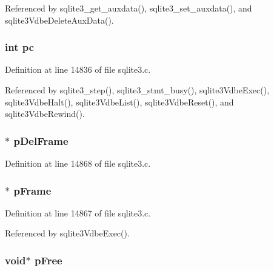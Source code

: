 Referenced by sqlite3\+\_\+get\+\_\+auxdata(), sqlite3\+\_\+set\+\_\+auxdata(), and sqlite3\+Vdbe\+Delete\+Aux\+Data().

\hypertarget{struct_vdbe_ac8c81e61335635fa4709d82412b31f06}{}
\subsubsection[{pc}]{\setlength{\rightskip}{0pt plus 5cm}int pc}\label{struct_vdbe_ac8c81e61335635fa4709d82412b31f06}


Definition at line 14836 of file sqlite3.\+c.



Referenced by sqlite3\+\_\+step(), sqlite3\+\_\+stmt\+\_\+busy(), sqlite3\+Vdbe\+Exec(), sqlite3\+Vdbe\+Halt(), sqlite3\+Vdbe\+List(), sqlite3\+Vdbe\+Reset(), and sqlite3\+Vdbe\+Rewind().

\hypertarget{struct_vdbe_a3f0f989bef6ce3640b7a508cb9b25901}{}
\subsubsection[{p\+Del\+Frame}]{$\ast$ p\+Del\+Frame}\label{struct_vdbe_a3f0f989bef6ce3640b7a508cb9b25901}


Definition at line 14868 of file sqlite3.\+c.

\hypertarget{struct_vdbe_ad71093eb5e589645373a69f115714ec7}{}
\subsubsection[{p\+Frame}]{$\ast$ p\+Frame}\label{struct_vdbe_ad71093eb5e589645373a69f115714ec7}


Definition at line 14867 of file sqlite3.\+c.



Referenced by sqlite3\+Vdbe\+Exec().

\hypertarget{struct_vdbe_a2c54a77225c501001750258d6b53f88d}{}
\subsubsection[{p\+Free}]{\setlength{\rightskip}{0pt plus 5cm}void$\ast$ p\+Free}\label{struct_vdbe_a2c54a77225c501001750258d6b53f88d}


